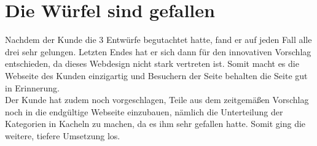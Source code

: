 \section{Die Würfel sind gefallen}
Nachdem der Kunde die 3 Entwürfe begutachtet hatte, fand er auf jeden Fall alle drei sehr gelungen. Letzten Endes hat er sich dann für den innovativen Vorschlag entschieden, da dieses Webdesign nicht stark vertreten ist. Somit macht es die Webseite des Kunden einzigartig und Besuchern der Seite behalten die Seite gut in Erinnerung. 
\\
Der Kunde hat zudem noch vorgeschlagen, Teile aus dem zeitgemäßen Vorschlag noch in die endgültige Webseite einzubauen, nämlich die Unterteilung der Kategorien in Kacheln zu machen, da es ihm sehr gefallen hatte. Somit ging die weitere, tiefere Umsetzung los.